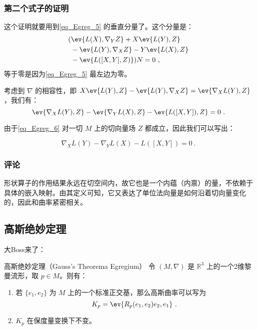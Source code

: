 \subsubsection{第二个式子的证明}

这个证明就要用到\autoref{eq_Egreg_5} 的垂直分量了。这个分量是：
\begin{equation}
\begin{aligned}
(&\ev{L(X), \nabla_YZ}+X\ev{L(Y), Z}\\&-\ev{L(Y), \nabla_XZ}-Y\ev{L(X), Z}\\&-\ev{L([X, Y], Z)})N=0~,
\end{aligned}
\end{equation}
等于零是因为\autoref{eq_Egreg_5} 最左边为零。

考虑到 $\nabla$ 的相容性，即 $X\ev{L(Y), Z}-\ev{L(Y), \nabla_XZ}=\ev{\nabla_XL(Y), Z}$，我们有：
\begin{equation}\label{eq_Egreg_6}
\ev{\nabla_XL(Y), Z}-\ev{\nabla_YL(X), Z}-\ev{L([X, Y]), Z}=0~.
\end{equation}

由于\autoref{eq_Egreg_6} 对一切 $M$ 上的切向量场 $Z$ 都成立，因此我们可以写出：

\begin{equation}
\nabla_XL(Y)-\nabla_YL(X)-L([X, Y])=0~.
\end{equation}

\subsubsection{评论}

形状算子的作用结果永远在切空间内，故它也是一个内蕴（内禀）的量，不依赖于具体的嵌入映射。由其定义可知，它又表达了单位法向量是如何沿着切向量变化的，因此和曲率紧密相关。





\subsection{高斯绝妙定理}

大Boss来了：

\begin{theorem}{高斯绝妙定理（Gauss's Theorema Egregium）}
令 $(M, \nabla)$ 是 $\mathbb{R}^3$ 上的一个2维黎曼流形，取 $p\in M$。则有：
\begin{enumerate}
\item 若 $\{e_1, e_2\}$ 为 $M$ 上的一个标准正交基，那么高斯曲率可以写为
\begin{equation}
K_p=\ev{R_p(e_1, e_2)e_2, e_1}~.
\end{equation}
\item $K_p$ 在保度量变换下不变。
\end{enumerate}

\end{theorem}

